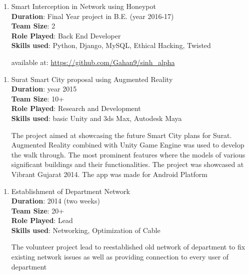 \documentclass[a4paper, 14pt]{article}
\begin{document}
	\begin{enumerate}[start=1,label={\bfseries $\Rightarrow$ TITLE - }]
		\addtolength{\itemindent}{40pt}
		\item Smart Interception in Network using Honeypot
		\\ \textbf{Duration}: Final Year project in B.E. (year 2016-17)
		\\ \textbf{Team Size}: 2
		\\ \textbf{Role Played}: Back End Developer
		\\ \textbf{Skills used}: Python, Django, MySQL, Ethical Hacking, Twisted
		
		available at: \url{https://github.com/Gahan9/sinh_alpha}
	\end{enumerate}

	\begin{enumerate}[start=1,label={\bfseries $\Rightarrow$ TITLE - }]
		\addtolength{\itemindent}{40pt}
		\item Surat Smart City proposal using Augmented Reality
		\\ \textbf{Duration}: year 2015
		\\ \textbf{Team Size}: 10+
		\\ \textbf{Role Played}: Research and Development
		\\ \textbf{Skills used}: basic Unity and 3ds Max, Autodesk Maya
		
		The project aimed at showcasing the future Smart City plans for Surat. Augmented Reality combined with Unity Game Engine was used to develop the walk through. The most prominent features where the models of various significant buildings and their functionalities. The project was showcased at Vibrant Gujarat 2014. The app was made for Android Platform
	\end{enumerate}
	

	\begin{enumerate}[start=1,label={\bfseries $\Rightarrow$ TITLE - }]
		\addtolength{\itemindent}{40pt}
		\item Establishment of Department Network
		\\ \textbf{Duration}: 2014 (two weeks)
		\\ \textbf{Team Size}: 20+
		\\ \textbf{Role Played}: Lead
		\\ \textbf{Skills used}:  Networking, Optimization of Cable
		
		The volunteer project lead to reestablished old network of department to fix existing network issues as well as providing connection to every user of department
	\end{enumerate}
\end{document}
